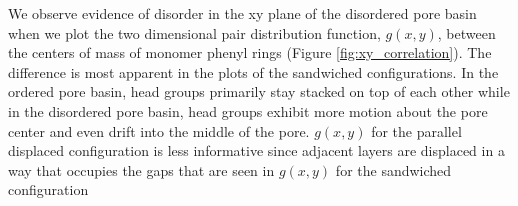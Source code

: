 \documentclass[journal=jpcbfk,manusciprt=article]{achemso}
\begin{document}

  We observe evidence of disorder in the xy plane of the disordered pore basin when
  we plot the two dimensional pair distribution function, $g(x,y)$, between the
  centers of mass of monomer phenyl rings (Figure \ref{fig:xy_correlation}). The
  difference is most apparent in the plots of the sandwiched configurations. In
  the ordered pore basin, head groups primarily stay stacked on top of each other
  while in the disordered pore basin, head groups exhibit more motion about the pore
  center and even drift into the middle of the pore. $g(x,y)$ for the parallel displaced
  configuration is less informative since adjacent layers are displaced in a way that
  occupies the gaps that are seen in $g(x,y)$ for the sandwiched configuration 
\end{document}

